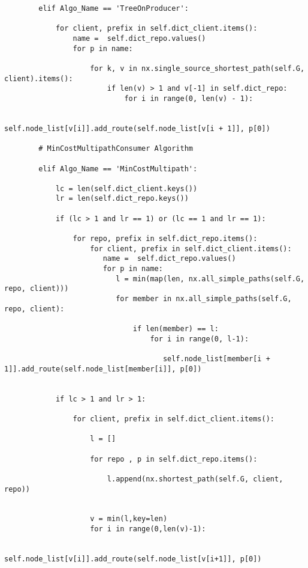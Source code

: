 \begin{lstlisting}
        elif Algo_Name == 'TreeOnProducer':

            for client, prefix in self.dict_client.items():
                name =  self.dict_repo.values()
                for p in name:

                    for k, v in nx.single_source_shortest_path(self.G, client).items():
                        if len(v) > 1 and v[-1] in self.dict_repo:
                            for i in range(0, len(v) - 1): 
     
                                self.node_list[v[i]].add_route(self.node_list[v[i + 1]], p[0])

        # MinCostMultipathConsumer Algorithm

        elif Algo_Name == 'MinCostMultipath':

            lc = len(self.dict_client.keys())
            lr = len(self.dict_repo.keys())

            if (lc > 1 and lr == 1) or (lc == 1 and lr == 1):

                for repo, prefix in self.dict_repo.items():
                    for client, prefix in self.dict_client.items():
                       name =  self.dict_repo.values()
                       for p in name:
                          l = min(map(len, nx.all_simple_paths(self.G, repo, client)))
                          for member in nx.all_simple_paths(self.G, repo, client):
                     
                              if len(member) == l:    
                                  for i in range(0, l-1): 

                                     self.node_list[member[i + 1]].add_route(self.node_list[member[i]], p[0])                               
    

            if lc > 1 and lr > 1:
                                                                                         
                for client, prefix in self.dict_client.items():

                    l = []

                    for repo , p in self.dict_repo.items():       
           
                        l.append(nx.shortest_path(self.G, client, repo))


                    v = min(l,key=len)
                    for i in range(0,len(v)-1):

                         self.node_list[v[i]].add_route(self.node_list[v[i+1]], p[0])   
                                                                       


\end{lstlisting}
